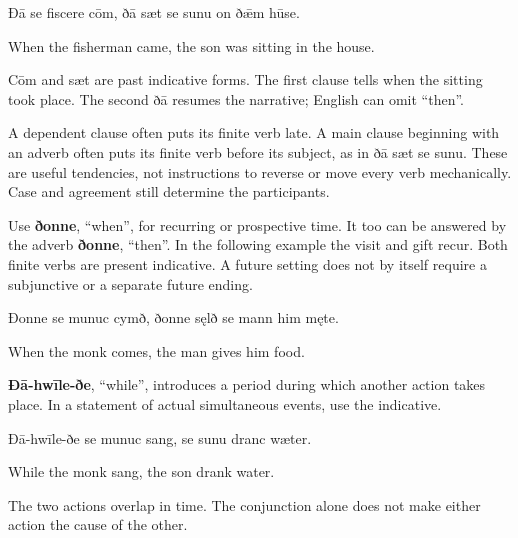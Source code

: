 Ðā se fiscere cōm, ðā sæt se sunu on ðǣm hūse.

When the fisherman came, the son was sitting in the house.

Cōm and sæt are past indicative forms. The first clause tells when the sitting took place. The second ðā resumes the narrative; English can omit “then”.

A dependent clause often puts its finite verb late. A main clause beginning with an adverb often puts its finite verb before its subject, as in ðā sæt se sunu. These are useful tendencies, not instructions to reverse or move every verb mechanically. Case and agreement still determine the participants.

Use \textbf{ðonne}, “when”, for recurring or prospective time. It too can be answered by the adverb \textbf{ðonne}, “then”. In the following example the visit and gift recur. Both finite verbs are present indicative. A future setting does not by itself require a subjunctive or a separate future ending.

Ðonne se munuc cymð, ðonne sęlð se mann him męte.

When the monk comes, the man gives him food.

\textbf{Ðā-hwīle-ðe}, “while”, introduces a period during which another action takes place. In a statement of actual simultaneous events, use the indicative.

Ðā-hwīle-ðe se munuc sang, se sunu dranc wæter.

While the monk sang, the son drank water.

The two actions overlap in time. The conjunction alone does not make either action the cause of the other.

